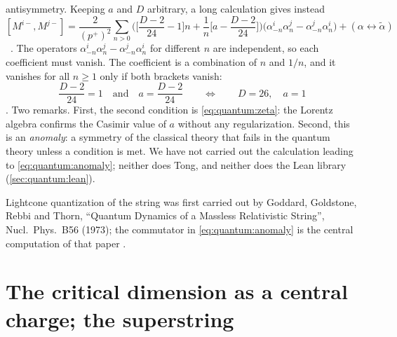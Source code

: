 antisymmetry. Keeping $a$ and $D$ arbitrary, a long calculation gives
instead
\begin{equation}\label{eq:quantum:anomaly}
 [M^{i-},M^{j-}]=\frac{2}{(p^+)^2}\sum_{n>0}
  \Big(\Big[\frac{D-2}{24}-1\Big]n+\frac1n\Big[a-\frac{D-2}{24}\Big]\Big)
  \big(\alpha^i_{-n}\alpha^j_n-\alpha^j_{-n}\alpha^i_n\big)+(\alpha\leftrightarrow\tilde\alpha)
\end{equation}
\TL\ . The operators
$\alpha^i_{-n}\alpha^j_n-\alpha^j_{-n}\alpha^i_n$ for different $n$ are independent, so each
coefficient must vanish. The coefficient is a combination of $n$ and $1/n$, and it vanishes
for all $n\geq1$ only if both brackets vanish:
\begin{equation}\label{eq:quantum:D26a1}
 \frac{D-2}{24}=1\quad\text{and}\quad a=\frac{D-2}{24}
 \qquad\Longleftrightarrow\qquad D=26,\quad a=1
\end{equation}
. Two remarks. First, the second condition is
\cref{eq:quantum:zeta}: the Lorentz algebra confirms the Casimir value of $a$ without any
regularization. Second, this is an \emph{anomaly}: a symmetry of the classical
theory that fails in the quantum theory unless a condition is met. We have not carried out
the calculation leading to \cref{eq:quantum:anomaly}; neither does Tong, and neither does
the Lean library (\cref{sec:quantum:lean}).

\begin{historybox}
Lightcone quantization of the string was first carried out by Goddard, Goldstone, Rebbi and
Thorn, ``Quantum Dynamics of a Massless Relativistic String'', Nucl.\ Phys.\ B56 (1973); the
commutator in \cref{eq:quantum:anomaly} is the central computation of that paper
.
\end{historybox}

\section{The critical dimension as a central charge; the superstring}
\label{sec:quantum:centralcharge}

